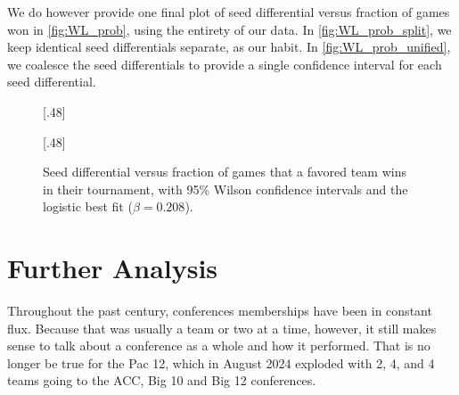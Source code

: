 \documentclass{article}
\begin{document}
We do however provide one final plot of seed differential versus fraction of games won in \autoref{fig:WL_prob}, using the entirety of our data.  In \autoref{fig:WL_prob_split}, we keep identical seed differentials separate, as our habit.  In \autoref{fig:WL_prob_unified}, we coalesce the seed differentials to provide a single confidence interval for each seed differential.
\begin{figure}
[.48\textwidth]{%
%
}\hfill
{}[.48\textwidth]{%
}%
\caption{\label{fig:WL_prob}Seed differential versus fraction of games that a favored team wins in their tournament, with 95\% Wilson confidence intervals and the logistic best fit ($\beta=0.208$).}
\end{figure}


\section{Further Analysis}

Throughout the past century, conferences memberships have been in constant flux.  Because that was usually a team or two at a time, however, it still makes sense to talk about a conference as a whole and how it performed.  That is no longer be true for the Pac 12, which in August 2024 exploded with 2, 4, and 4 teams going to the ACC, Big 10 and Big 12 conferences.
\end{document}
